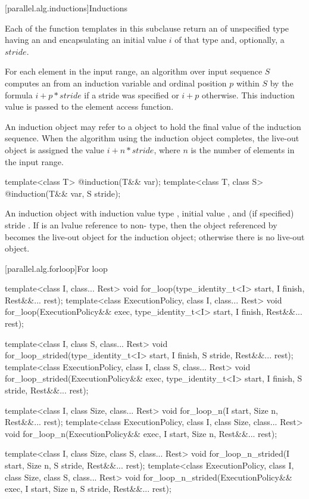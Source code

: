 [parallel.alg.inductions]{Inductions}

\pnum
Each of the function templates in this subclause return an  of unspecified type having an  and encapsulating an initial value $i$ of that type and, optionally, a $stride$.

\pnum
For each element in the input range, an algorithm over input sequence $S$ computes an  from an induction variable and ordinal position $p$ within $S$ by the formula $i + p * stride$ if a stride was specified or $i + p$ otherwise. This induction value is passed to the element access function.

\pnum
An induction object may refer to a  object to hold the final value of the induction sequence. When the algorithm using the induction object completes, the live-out object is assigned the value $i + n * stride$, where $n$ is the number of elements in the input range.

\begin{itemdecl}
template<class T>
  @\unspec@ induction(T&& var);
template<class T, class S>
  @\unspec@ induction(T&& var, S stride);
\end{itemdecl}

\begin{itemdescr}
\pnum
\returns An induction object with induction value type , initial value , and (if specified) stride . If  is an lvalue reference to non- type, then the object referenced by  becomes the live-out object for the induction object; otherwise there is no live-out object.
\end{itemdescr}

[parallel.alg.forloop]{For loop}

\begin{itemdecl}
template<class I, class... Rest>
  void for_loop(type_identity_t<I> start, I finish, Rest&&... rest);
template<class ExecutionPolicy, class I, class... Rest>
  void for_loop(ExecutionPolicy&& exec, type_identity_t<I> start, I finish, Rest&&... rest);

template<class I, class S, class... Rest>
  void for_loop_strided(type_identity_t<I> start, I finish, S stride, Rest&&... rest);
template<class ExecutionPolicy, class I, class S, class... Rest>
  void for_loop_strided(ExecutionPolicy&& exec, type_identity_t<I> start, I finish, S stride,
                        Rest&&... rest);

template<class I, class Size, class... Rest>
  void for_loop_n(I start, Size n, Rest&&... rest);
template<class ExecutionPolicy, class I, class Size, class... Rest>
  void for_loop_n(ExecutionPolicy&& exec, I start, Size n, Rest&&... rest);

template<class I, class Size, class S, class... Rest>
  void for_loop_n_strided(I start, Size n, S stride, Rest&&... rest);
template<class ExecutionPolicy, class I, class Size, class S, class... Rest>
  void for_loop_n_strided(ExecutionPolicy&& exec, I start, Size n, S stride, Rest&&... rest);
\end{itemdecl}

